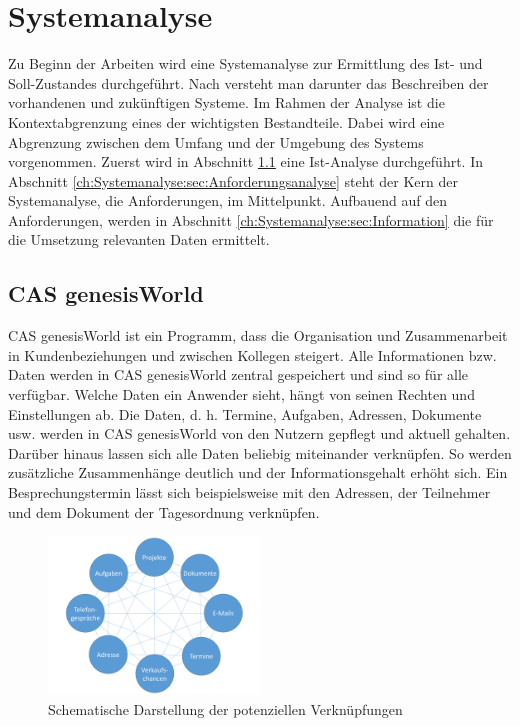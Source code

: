 
\chapter{Systemanalyse}
\label{ch:Systemanalyse}

Zu Beginn der Arbeiten wird eine Systemanalyse zur Ermittlung des Ist- und Soll-Zustandes durchgeführt. Nach \cite{SWB-380277719} versteht man darunter das Beschreiben der vorhandenen und zukünftigen Systeme. Im Rahmen der Analyse ist die Kontextabgrenzung eines der wichtigsten Bestandteile. Dabei wird eine Abgrenzung zwischen dem Umfang und der Umgebung des Systems vorgenommen. Zuerst wird in Abschnitt \ref{ch:Systemanalyse:sec:genesisWorld} eine Ist-Analyse durchgeführt. In Abschnitt \ref{ch:Systemanalyse:sec:Anforderungsanalyse} steht der Kern der Systemanalyse, die Anforderungen, im Mittelpunkt. Aufbauend auf den Anforderungen, werden in Abschnitt \ref{ch:Systemanalyse:sec:Information} die für die Umsetzung relevanten Daten ermittelt. 

\section{CAS genesisWorld}
\label{ch:Systemanalyse:sec:genesisWorld}

CAS genesisWorld ist ein Programm, dass die Organisation und Zusammenarbeit in Kundenbeziehungen und zwischen Kollegen steigert. Alle Informationen bzw. Daten werden in CAS genesisWorld zentral gespeichert und sind so für alle verfügbar. Welche Daten ein Anwender sieht, hängt von seinen Rechten und Einstellungen ab. Die Daten, d. h. Termine, Aufgaben, Adressen, Dokumente usw. werden in CAS genesisWorld von den Nutzern gepflegt und aktuell gehalten. Darüber hinaus lassen sich alle Daten beliebig miteinander verknüpfen. So werden zusätzliche Zusammenhänge deutlich und der Informationsgehalt erhöht sich. Ein Besprechungstermin lässt sich beispielsweise mit den Adressen, der Teilnehmer und dem Dokument der Tagesordnung verknüpfen.

\begin{figure}[H]
	\centering
  \includegraphics[width=0.5\textwidth, width=0.5\textwidth]{pics/CAS_connections.pdf}
	\caption{Schematische Darstellung der potenziellen Verknüpfungen}
	\label{picGwCon}
\end{figure}

